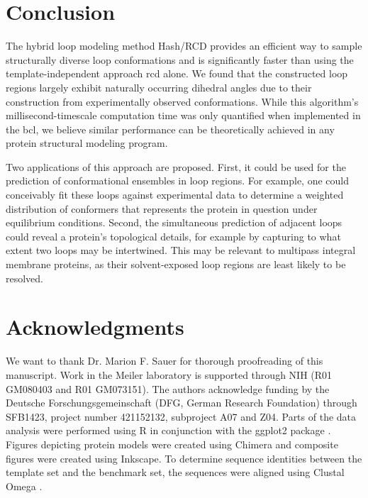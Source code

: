 \section{Conclusion}

The hybrid loop modeling method Hash/RCD provides an efficient way to sample structurally diverse loop conformations and is significantly faster than using the template-independent approach \gls{rcd} alone. We found that the constructed loop regions largely exhibit naturally occurring dihedral angles due to their construction from experimentally observed conformations. While this algorithm’s millisecond-timescale computation time was only quantified when implemented in the \gls{bcl}, we believe similar performance can be theoretically achieved in any protein structural modeling program.

Two applications of this approach are proposed. First, it could be used for the prediction of conformational ensembles in loop regions. For example, one could conceivably fit these loops against experimental data to determine a weighted distribution of conformers that represents the protein in question under equilibrium conditions. Second, the simultaneous prediction of adjacent loops could reveal a protein’s topological details, for example by capturing to what extent two loops may be intertwined. This may be relevant to multipass integral membrane proteins, as their solvent-exposed loop regions are least likely to be resolved.

\section{Acknowledgments}

We want to thank Dr. Marion F. Sauer for thorough proofreading of this manuscript. Work in the Meiler laboratory is supported through NIH (R01 GM080403 and R01 GM073151). The authors acknowledge funding by the Deutsche Forschungsgemeinschaft (DFG, German Research Foundation) through SFB1423, project number 421152132, subproject A07 and Z04. Parts of the data analysis were performed using R in conjunction with the ggplot2 package \citep*{Wickham2009}. Figures depicting protein models were created using Chimera \citep*{Pettersen2004} and composite figures were created using Inkscape. To determine sequence identities between the template set and the benchmark set, the sequences were aligned using Clustal Omega \citep*{Sievers2011}.

